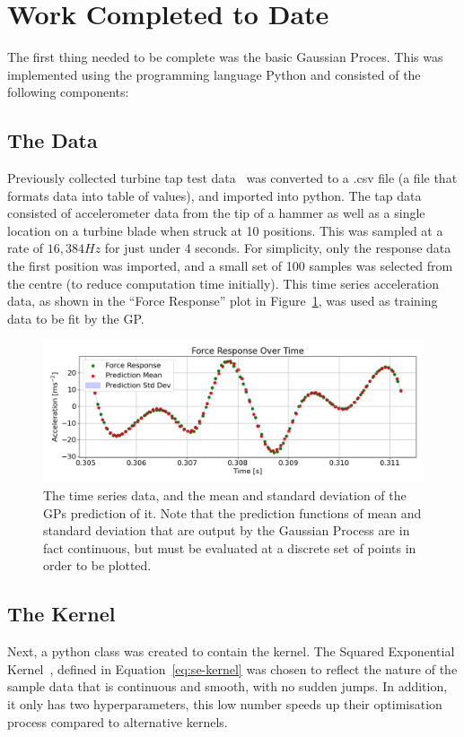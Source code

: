 \documentclass[12pt]{article}
\begin{document}
    \section{Work Completed to Date}
    The first thing needed to be complete was the basic Gaussian Proces.
    This was implemented using the programming language Python and consisted of the following components:
    \subsection{The Data}
    Previously collected turbine tap test data~\cite{MEC326} was converted to a .csv file (a file that formats data into table of values), and imported into python.
    The tap data consisted of accelerometer data from the tip of a hammer as well as a single location on a turbine blade when struck at 10 positions.
    This was sampled at a rate of $16,384 Hz$ for just under 4 seconds.
    For simplicity, only the response data the first position was imported, and a small set of 100 samples was selected from the centre (to reduce computation time initially).
    This time series acceleration data, as shown in the ``Force Response'' plot in Figure~\ref{fig:input-response-plot}, was used as training data to be fit by the GP\@.

    \begin{figure}[ht]
        \centering
        \includegraphics[width=1.0\linewidth]{figures/input-response-plot/input-response-plot.png}
        \caption{The time series data, and the mean and standard deviation of the GPs prediction of it. Note that the prediction functions of mean and standard deviation that are output by the Gaussian Process are in fact continuous, but must be evaluated at a discrete set of points in order to be plotted.}
        \label{fig:input-response-plot}
    \end{figure}



    \subsection{The Kernel}
    Next, a python class was created to contain the kernel.
    The Squared Exponential Kernel~\cite{duvenaud2014kernel}, defined in Equation~\ref{eq:se-kernel} was chosen to reflect the nature of the sample data that is continuous and smooth, with no sudden jumps.
    In addition, it only has two hyperparameters, this low number speeds up their optimisation process compared to alternative kernels.
\end{document}
